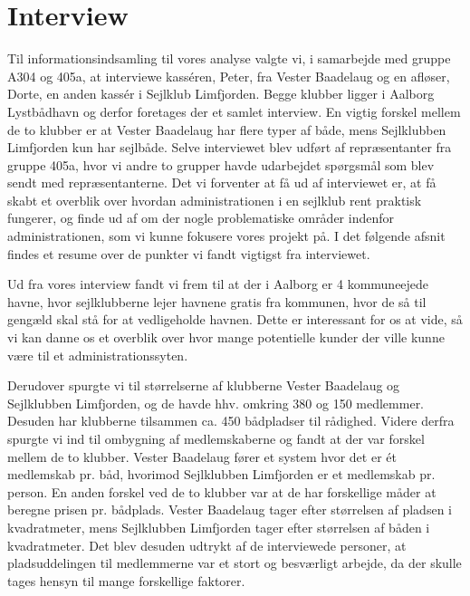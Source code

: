 \begin{flushleft}

\end{flushleft}\chapter{Interview}\label{chap:Interview}
Til informationsindsamling til vores analyse valgte vi, i samarbejde med gruppe A304 og 405a, at interviewe kasséren,
Peter, fra Vester Baadelaug og en afløser, Dorte, en anden kassér i Sejlklub Limfjorden. Begge klubber ligger i
Aalborg Lystbådhavn og derfor foretages der et samlet interview. En vigtig forskel mellem de to klubber er at Vester
Baadelaug har flere typer af både, mens Sejlklubben Limfjorden kun har sejlbåde. Selve interviewet blev udført af
repræsentanter fra gruppe 405a, hvor vi andre to grupper havde udarbejdet spørgsmål som blev sendt med repræsentanterne.
Det vi forventer at få ud af interviewet er, at få skabt et overblik over hvordan administrationen i en sejlklub rent
praktisk fungerer, og finde ud af om der nogle problematiske områder indenfor administrationen, som vi kunne fokusere
vores projekt på. I det følgende afsnit findes et resume over de punkter vi fandt vigtigst fra interviewet.

Ud fra vores interview fandt vi frem til at der i Aalborg er 4 kommuneejede havne, hvor sejlklubberne lejer havnene
gratis fra kommunen, hvor de så til gengæld skal stå for at vedligeholde havnen. Dette er interessant for os at vide, så
vi kan danne os et overblik over hvor mange potentielle kunder der ville kunne være til et administrationssyten. 

Derudover spurgte vi til størrelserne af klubberne Vester Baadelaug og Sejlklubben Limfjorden, og de havde hhv. omkring
380 og 150 medlemmer. Desuden har klubberne tilsammen ca. 450 bådpladser til rådighed. Videre derfra spurgte vi ind til
ombygning af medlemskaberne og fandt at der var forskel mellem de to klubber. Vester Baadelaug fører et system hvor det er
ét medlemskab pr. båd, hvorimod Sejlklubben Limfjorden er et medlemskab pr. person. En anden forskel ved de to klubber
var at de har forskellige måder at beregne prisen pr. bådplads. Vester Baadelaug tager efter størrelsen af pladsen i
kvadratmeter, mens Sejlklubben Limfjorden tager efter størrelsen af båden i kvadratmeter. Det blev desuden udtrykt af de
interviewede personer, at pladsuddelingen til medlemmerne var et stort og besværligt arbejde, da der skulle tages
hensyn til mange forskellige faktorer.

